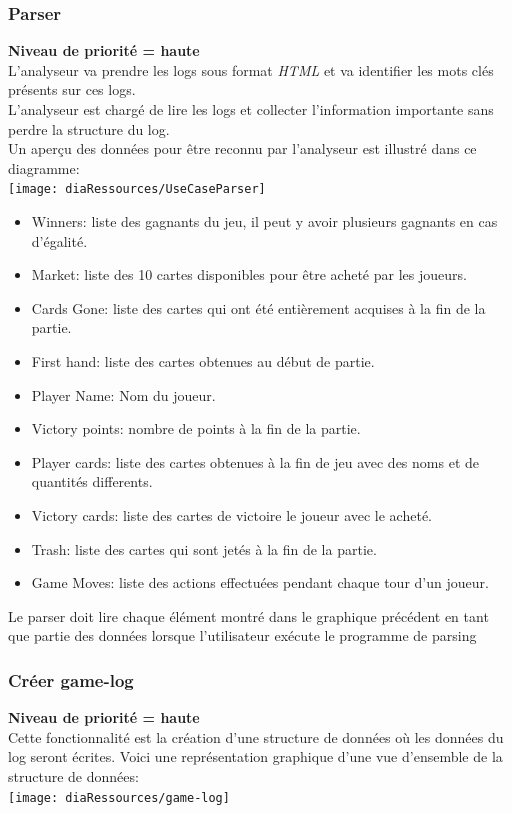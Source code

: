 \subsubsection{Parser}

\textbf{Niveau de priorité = haute}\\
L'analyseur va prendre les logs sous format \textit{HTML} et va identifier les mots clés présents sur ces logs.\\
L'analyseur est chargé de lire les logs et collecter l'information importante sans perdre la structure du log.\\
Un aperçu des données pour être reconnu par l'analyseur est illustré dans ce diagramme:\\
\texttt{[image: diaRessources/UseCaseParser]}

\begin{itemize}
\item Winners: liste des gagnants du jeu, il peut y avoir plusieurs gagnants en cas d'égalité.
\item Market: liste des 10 cartes disponibles pour être acheté par les joueurs.
\item Cards Gone: liste des cartes qui ont été entièrement acquises à la fin de la partie.
\item First hand: liste des cartes obtenues au début de partie.%
\item Player Name: Nom du joueur.
\item Victory points: nombre de points à la fin de la partie.
\item Player cards: liste des cartes obtenues à la fin de jeu avec des noms et de quantités differents.
\item Victory cards: liste des cartes de victoire le joueur avec le acheté.
\item Trash: liste des cartes qui sont jetés à la fin de la partie.
\item Game Moves: liste des actions effectuées pendant chaque tour d'un joueur.
\end{itemize}
Le parser doit lire chaque élément montré dans le graphique précédent en tant que partie des données lorsque l'utilisateur exécute le programme de parsing\\

\subsubsection{Créer game-log}
\textbf{Niveau de priorité = haute}\\
Cette fonctionnalité est la création d'une structure de données où les données du log seront écrites.
Voici une représentation graphique d'une vue d'ensemble de la structure de données:\\
\texttt{[image: diaRessources/game-log]}

